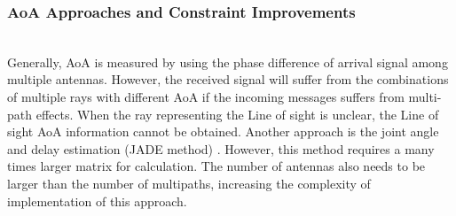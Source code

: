 \documentclass{l4proj}
\begin{document}
\subsubsection{AoA Approaches and Constraint Improvements}~\\
Generally, AoA is measured by using the phase difference of arrival signal among multiple antennas. However, the received signal will suffer from the combinations of multiple rays with different AoA if the incoming messages suffers from multi-path effects. When the ray representing the Line of sight is unclear, the Line of sight AoA information cannot be obtained. Another approach is the joint angle and delay estimation (JADE method)\cite{jade} . However, this method requires a many times larger matrix for calculation. The number of antennas also needs to be larger than the number of multipaths, increasing the complexity of implementation of this approach.\cite{aoaproblems}\\
\end{document}
